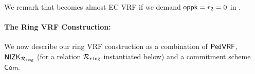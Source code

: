 %



We remark that \PedVRF becomes almost EC VRF if
we demand $\mathsf{oppk} = r_2 = 0$ in \Sign.

\paragraph{The Ring VRF Construction:} We now describe  our ring VRF construction as a combination of $ {\mathsf{PedVRF}} $, $ {\mathsf{NIZK}}_{\mathcal{R}_{\mathtt{ring}}} $ (for a relation 
$\mathcal{R}_{\mathtt{ring}}$ instantiated below) and a commitment scheme $ \mathsf{Com} $.

